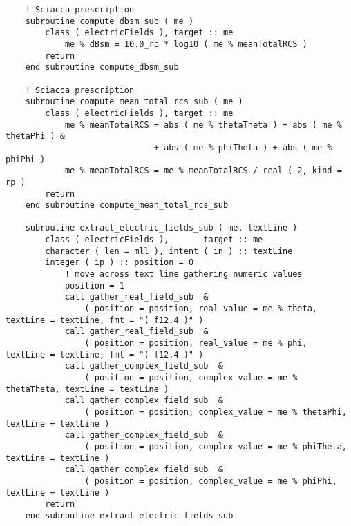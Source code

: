 {{\begin{lstlisting}
    ! Sciacca prescription
    subroutine compute_dbsm_sub ( me )
        class ( electricFields ), target :: me
            me % dBsm = 10.0_rp * log10 ( me % meanTotalRCS )
        return
    end subroutine compute_dbsm_sub

    ! Sciacca prescription
    subroutine compute_mean_total_rcs_sub ( me )
        class ( electricFields ), target :: me
            me % meanTotalRCS = abs ( me % thetaTheta ) + abs ( me % thetaPhi ) &
                              + abs ( me % phiTheta ) + abs ( me % phiPhi )
            me % meanTotalRCS = me % meanTotalRCS / real ( 2, kind = rp )
        return
    end subroutine compute_mean_total_rcs_sub

    subroutine extract_electric_fields_sub ( me, textLine )
        class ( electricFields ),       target :: me
        character ( len = mll ), intent ( in ) :: textLine
        integer ( ip ) :: position = 0
            ! move across text line gathering numeric values
            position = 1
            call gather_real_field_sub  &
                ( position = position, real_value = me % theta, textLine = textLine, fmt = "( f12.4 )" )
            call gather_real_field_sub  &
                ( position = position, real_value = me % phi,   textLine = textLine, fmt = "( f12.4 )" )
            call gather_complex_field_sub  &
                ( position = position, complex_value = me % thetaTheta, textLine = textLine )
            call gather_complex_field_sub  &
                ( position = position, complex_value = me % thetaPhi,   textLine = textLine )
            call gather_complex_field_sub  &
                ( position = position, complex_value = me % phiTheta,   textLine = textLine )
            call gather_complex_field_sub  &
                ( position = position, complex_value = me % phiPhi,     textLine = textLine )
        return
    end subroutine extract_electric_fields_sub


\end{lstlisting}}}
